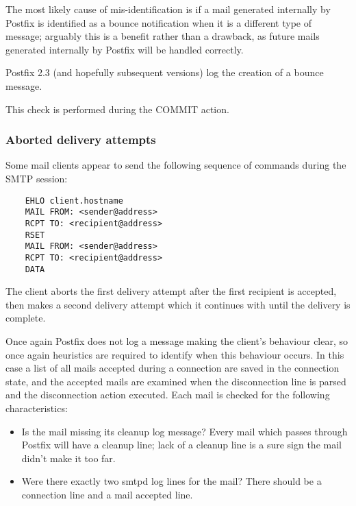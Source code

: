 \documentclass[a4paper,12pt,draft]{article}
\begin{document}
The most likely cause of mis-identification is if a mail generated
internally by Postfix is identified as a bounce notification when it is a
different type of message; arguably this is a benefit rather than a
drawback, as future mails generated internally by Postfix will be handled
correctly.

Postfix 2.3 (and hopefully subsequent versions) log the creation of a
bounce message.

This check is performed during the COMMIT action.

\subsubsection{Aborted delivery attempts}

\label{aborted-delivery-attempts}

Some mail clients appear to send the following sequence of commands during
the SMTP session:

\begin{verbatim}
    EHLO client.hostname
    MAIL FROM: <sender@address>
    RCPT TO: <recipient@address>
    RSET
    MAIL FROM: <sender@address>
    RCPT TO: <recipient@address>
    DATA
\end{verbatim}

The client aborts the first delivery attempt after the first recipient is
accepted, then makes a second delivery attempt which it continues with
until the delivery is complete.

Once again Postfix does not log a message making the client's behaviour
clear, so once again heuristics are required to identify when this
behaviour occurs.  In this case a list of all mails accepted during a
connection are saved in the connection state, and the accepted mails are
examined when the disconnection line is parsed and the disconnection action
executed.  Each mail is checked for the following characteristics:

\begin{itemize}

    \item Is the mail missing its cleanup log message?  Every mail which
        passes through Postfix will have a cleanup line; lack of a cleanup
        line is a sure sign the mail didn't make it too far.

    \item Were there exactly two smtpd log lines for the mail?  There
        should be a connection line and a mail accepted line.

\end{itemize}
\end{document}
